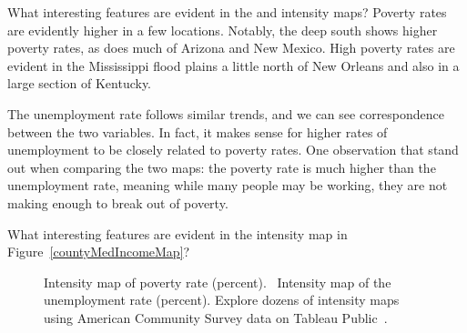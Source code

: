 \begin{examplewrap}
\begin{nexample}{What interesting features are evident in the
     and 
    intensity maps?}
  Poverty rates are evidently higher in a few locations.
  Notably, the deep south shows higher poverty rates,
  as does much of Arizona and New Mexico.
  High poverty rates are evident in the Mississippi
  flood plains a little north of New Orleans and
  also in a large section of Kentucky.

  The unemployment rate follows similar trends,
  and we can see correspondence between the two
  variables. In fact, it makes sense for higher rates
  of unemployment to be closely related to poverty rates.
  One observation that stand out when comparing the two maps:
  the poverty rate is much higher than the unemployment
  rate, meaning while many people may be working,
  they are not making enough to break out of poverty.
\end{nexample}
\end{examplewrap}

\begin{exercisewrap}
\begin{nexercise}
What interesting features are evident in the
 intensity map in
Figure~\ref{countyMedIncomeMap}?\footnotemark{}
\end{nexercise}
\end{exercisewrap}

\begin{figure}
  \centering
{}
  \caption{ Intensity map of
      poverty rate (percent).
      ~Intensity map of the
      unemployment rate (percent).  Explore dozens of intensity maps using American Community Survey data on Tableau Public~.}
  \label{countyIntensityMaps1}
\end{figure}

